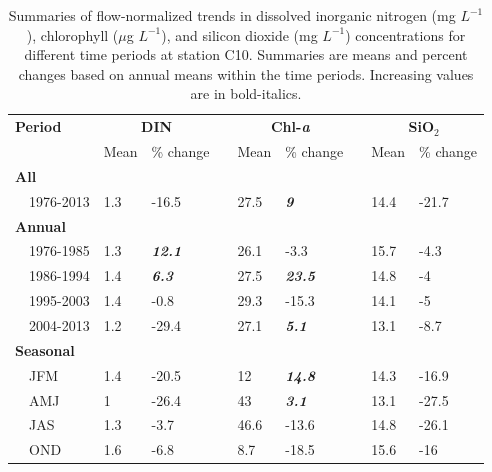 \documentclass[letterpaper,12pt,oneside]{article}\usepackage[]{graphicx}\usepackage[]{color}
\begin{document}
\begin{table}[!tbp]
\caption{Summaries of flow-normalized trends in dissolved inorganic nitrogen (mg $L^{-1}$), chlorophyll ($\mu$g $L^{-1}$), and silicon dioxide (mg $L^{-1}$) concentrations for different time periods at station C10. Summaries are means and percent changes based on annual means within the time periods.  Increasing values are in bold-italics.\label{tab:c10chg}} 
\begin{center}
\begin{tabular}{lllcllcll}
\hline\hline
\multicolumn{1}{l}{\bfseries Period}&\multicolumn{2}{c}{\bfseries DIN}&\multicolumn{1}{c}{\bfseries }&\multicolumn{2}{c}{\bfseries Chl-\textit{a}}&\multicolumn{1}{c}{\bfseries }&\multicolumn{2}{c}{\bfseries SiO$_2$}\tabularnewline
\cline{2-3} \cline{5-6} \cline{8-9}
\multicolumn{1}{l}{}&\multicolumn{1}{c}{Mean}&\multicolumn{1}{c}{\% change}&\multicolumn{1}{c}{}&\multicolumn{1}{c}{Mean}&\multicolumn{1}{c}{\% change}&\multicolumn{1}{c}{}&\multicolumn{1}{c}{Mean}&\multicolumn{1}{c}{\% change}\tabularnewline
\hline
{\bfseries All}&&&&&&&&\tabularnewline
~~1976-2013&1.3&-16.5&&27.5&\textit{\textbf{9}}&&14.4&-21.7\tabularnewline
\hline
{\bfseries Annual}&&&&&&&&\tabularnewline
~~1976-1985&1.3&\textit{\textbf{12.1}}&&26.1&-3.3&&15.7&-4.3\tabularnewline
~~1986-1994&1.4&\textit{\textbf{6.3}}&&27.5&\textit{\textbf{23.5}}&&14.8&-4\tabularnewline
~~1995-2003&1.4&-0.8&&29.3&-15.3&&14.1&-5\tabularnewline
~~2004-2013&1.2&-29.4&&27.1&\textit{\textbf{5.1}}&&13.1&-8.7\tabularnewline
\hline
{\bfseries Seasonal}&&&&&&&&\tabularnewline
~~JFM&1.4&-20.5&&12&\textit{\textbf{14.8}}&&14.3&-16.9\tabularnewline
~~AMJ&1&-26.4&&43&\textit{\textbf{3.1}}&&13.1&-27.5\tabularnewline
~~JAS&1.3&-3.7&&46.6&-13.6&&14.8&-26.1\tabularnewline
~~OND&1.6&-6.8&&8.7&-18.5&&15.6&-16\tabularnewline
\hline
\end{tabular}\end{center}

\end{table}
\end{document}
